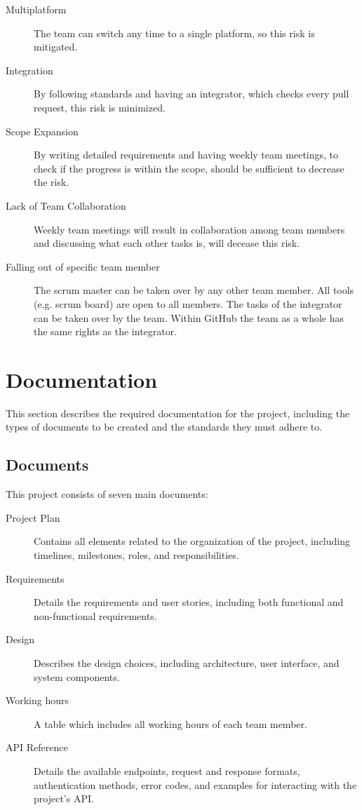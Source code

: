 \documentclass{projdoc}
\begin{document}
\begin{description}
	\item[Multiplatform] The team can switch any time to a single platform, so this
		risk is mitigated.
	\item[Integration] By following standards and having an integrator, which checks
		every pull request, this risk is minimized.
	\item[Scope Expansion] By writing detailed requirements and having weekly team
		meetings, to check if the progress is within the scope, should be sufficient to
		decrease the risk.
	\item[Lack of Team Collaboration] Weekly team meetings will result in collaboration among team members and discussing what each other tasks is, will decease this risk.
	\item[Falling out of specific team member] The scrum master can be taken over by any other team member. All tools (e.g. scrum board) are open to all members. The tasks of the integrator can be taken over by the team. Within GitHub the team as a whole has the same rights as the integrator.
\end{description}

\section{Documentation}

This section describes the required documentation for the project, including the
types of documents to be created and the standards they must adhere to.

\subsection{Documents}

This project consists of seven main documents:\noparbreak
\begin{description}
	\item[Project Plan] Contains all elements related to the organization of the
		project, including timelines, milestones, roles, and responsibilities.
	\item[Requirements] Details the requirements and user stories, including both
		functional and non-functional requirements.
	\item[Design] Describes the design choices, including architecture, user interface,
		and system components.
	\item[Working hours] A table which includes all working hours of each team member.
	\item[API Reference] Details the available endpoints, request and response formats,
		authentication methods, error codes, and examples for interacting with the
		project's API.
\end{description}
\end{document}
